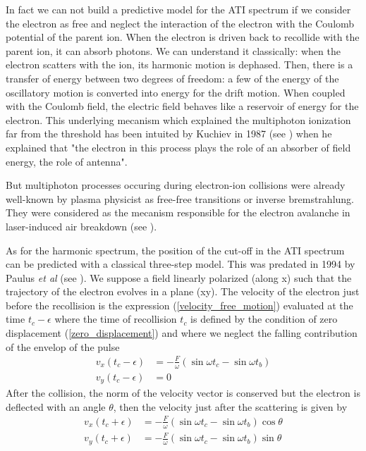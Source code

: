 \documentclass[a4paper]{article}
\begin{document}
\par
In fact we can not build a predictive model for the ATI spectrum if we consider the electron as free and neglect the interaction of the electron with the Coulomb potential of the parent ion. When the electron is driven back to recollide with the parent ion, it can absorb photons. We can understand it classically: when the electron scatters with the ion, its harmonic motion is dephased. Then, there is a transfer of energy between two degrees of freedom: a few of the energy of the oscillatory motion is converted into energy for the drift motion. When coupled with the Coulomb field, the electric field behaves like a reservoir of energy for the electron. This underlying mecanism which explained the multiphoton ionization far from the threshold has been intuited by Kuchiev in 1987 (see \cite{Kuchiev_1987}) when he explained that "the electron in this process plays the role of an absorber of field energy, the role of antenna".
\par
But multiphoton processes occuring during electron-ion collisions were already well-known by plasma physicist as free-free transitions or inverse bremstrahlung. They were considered as the mecanism responsible for the electron avalanche in laser-induced air breakdown (see \cite{Chin_2004}).
\par
As for the harmonic spectrum, the position of the cut-off in the ATI spectrum can be predicted with a classical three-step model. This was predated in 1994 by Paulus \textit{et al} (see \cite{Paulus_1994}). We suppose a field linearly polarized (along x) such that the trajectory of the electron evolves in a plane (xy). The velocity of the electron just before the recollision is the expression (\ref{velocity_free_motion}) evaluated at the time $t_{c}-\epsilon$ where the time of recollision $t_{c}$ is defined by the condition of zero displacement (\ref{zero_displacement}) and where we neglect the falling contribution of the envelop of the pulse
\begin{align}
v_{x}(t_{c}-\epsilon)&=-\frac{F}{\omega} \left( \sin{\omega t_{c}} - \sin{\omega t_{b}} \right) \\
v_{y}(t_{c}-\epsilon)&=0
\end{align}
After the collision, the norm of the velocity vector is conserved but the electron is deflected with an angle $\theta$, then the velocity just after the scattering is given by
\begin{align}
v_{x}(t_{c}+\epsilon)&=-\frac{F}{\omega} \left( \sin{\omega t_{c}} - \sin{\omega t_{b}} \right) \cos{\theta} \\
v_{y}(t_{c}+\epsilon)&=-\frac{F}{\omega} \left( \sin{\omega t_{c}} - \sin{\omega t_{b}} \right) \sin{\theta}
\end{align}
\end{document}
